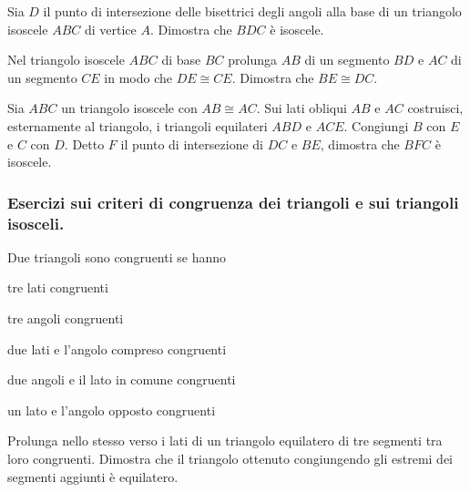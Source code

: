 \begin{multicols}{2}
\begin{esercizio}
\label{ese:2.51}
Sia \(D\) il punto di intersezione delle bisettrici degli angoli alla 
base di un triangolo isoscele \(ABC\) di vertice \(A\). Dimostra che 
\(BDC\) è isoscele.
\end{esercizio}

\begin{esercizio}
\label{ese:2.52}
Nel triangolo isoscele \(ABC\) di base \(BC\) prolunga \(AB\) di un 
segmento \(BD\) e \(AC\) di un segmento \(CE\) in modo che \(DE\cong CE\). 
Dimostra che \(BE\cong DC\).
\end{esercizio}

\begin{esercizio}
\label{ese:2.53}
Sia \(ABC\) un triangolo isoscele con \(AB\cong AC\). Sui lati obliqui 
\(AB\) e \(AC\) costruisci, esternamente al triangolo, i triangoli 
equilateri \(ABD\) e \(ACE\). Congiungi \(B\) con \(E\) e \(C\) con \(D\). Detto 
\(F\) il punto di intersezione di \(DC\) e \(BE\), dimostra che \(BFC\) è 
isoscele.
\end{esercizio}

\subsubsection*{Esercizi sui criteri di congruenza dei triangoli e 
sui triangoli isosceli.}

\begin{esercizio}
\label{ese:2.54}
Due triangoli sono congruenti se hanno
\begin{enumeratea}
\item tre lati congruenti \hfill\boxV\quad\boxF
\item tre angoli congruenti \hfill\boxV\quad\boxF
\item due lati e l'angolo compreso congruenti\tab\hfill\boxV\quad\boxF
\item due angoli e il lato in comune 
congruenti\tab\hfill\boxV\quad\boxF
\item un lato e l'angolo opposto 
congruenti\tab\tab\hfill\boxV\quad\boxF
\end{enumeratea}
\end{esercizio}

\begin{esercizio}
\label{ese:2.55}
Prolunga nello stesso verso i lati di un triangolo equilatero di tre 
segmenti tra loro congruenti. Dimostra che il triangolo ottenuto 
congiungendo gli estremi dei segmenti aggiunti è equilatero.
\end{esercizio}


\end{multicols}
